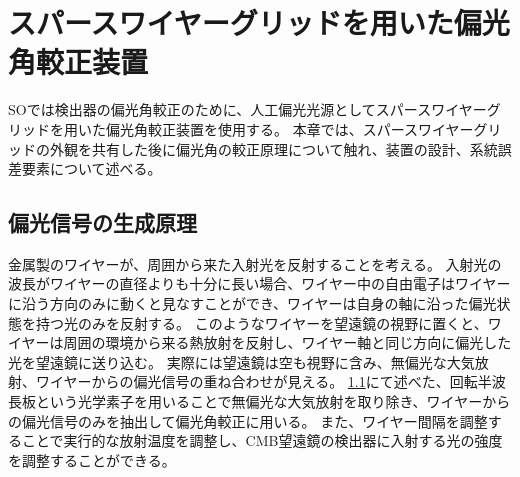 \documentclass[../../main.tex]{subfiles}
\begin{document}
\chapter{スパースワイヤーグリッドを用いた偏光角較正装置}
SOでは検出器の偏光角較正のために、人工偏光光源としてスパースワイヤーグリッドを用いた偏光角較正装置を使用する。
本章では、スパースワイヤーグリッドの外観を共有した後に偏光角の較正原理について触れ、装置の設計、系統誤差要素について述べる。

\section{偏光信号の生成原理}
金属製のワイヤーが、周囲から来た入射光を反射することを考える。
入射光の波長がワイヤーの直径よりも十分に長い場合、ワイヤー中の自由電子はワイヤーに沿う方向のみに動くと見なすことができ、ワイヤーは自身の軸に沿った偏光状態を持つ光のみを反射する。
このようなワイヤーを望遠鏡の視野に置くと、ワイヤーは周囲の環境から来る熱放射を反射し、ワイヤー軸と同じ方向に偏光した光を望遠鏡に送り込む。
実際には望遠鏡は空も視野に含み、無偏光な大気放射、ワイヤーからの偏光信号の重ね合わせが見える。
\ref{}にて述べた、回転半波長板という光学素子を用いることで無偏光な大気放射を取り除き、ワイヤーからの偏光信号のみを抽出して偏光角較正に用いる。
また、ワイヤー間隔を調整することで実行的な放射温度を調整し、CMB望遠鏡の検出器に入射する光の強度を調整することができる。
\end{document}
